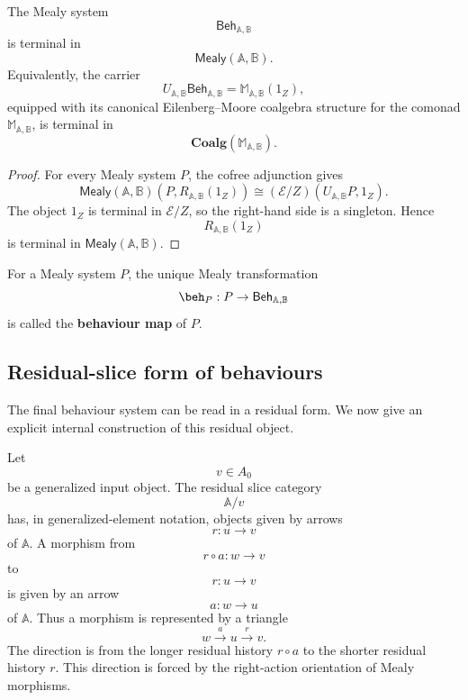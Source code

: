 \begin{theorem}
\label{thm:final-behaviour-coalgebra}
The Mealy system
\[
\mathsf{Beh}_{\mathbb A,\mathbb B}
\]
is terminal in
\[
\mathsf{Mealy}(\mathbb A,\mathbb B).
\]
Equivalently, the carrier
\[
U_{\mathbb A,\mathbb B}\mathsf{Beh}_{\mathbb A,\mathbb B}
=
\mathbb M_{\mathbb A,\mathbb B}(1_Z),
\]
equipped with its canonical Eilenberg--Moore coalgebra structure for the
comonad \(\mathbb M_{\mathbb A,\mathbb B}\), is terminal in
\[
\mathbf{Coalg}(\mathbb M_{\mathbb A,\mathbb B}).
\]
\end{theorem}

\begin{proof}
For every Mealy system \(P\), the cofree adjunction gives
\[
\mathsf{Mealy}(\mathbb A,\mathbb B)
(P,R_{\mathbb A,\mathbb B}(1_Z))
\cong
(\mathcal E/Z)(U_{\mathbb A,\mathbb B}P,1_Z).
\]
The object \(1_Z\) is terminal in \(\mathcal E/Z\), so the right-hand side is
a singleton. Hence
\[
R_{\mathbb A,\mathbb B}(1_Z)
\]
is terminal in \(\mathsf{Mealy}(\mathbb A,\mathbb B)\).
\end{proof}

\begin{definition}
\label{def:behaviour-map}
For a Mealy system \(P\), the unique Mealy transformation
\[
\beh_P:
P\to\mathsf{Beh}_{\mathbb A,\mathbb B}
\]
is called the \textbf{behaviour map} of \(P\).
\end{definition}

\subsection{Residual-slice form of behaviours}
\label{subsec:residual-slice-form-behaviours}

The final behaviour system can be read in a residual form. We now give an
explicit internal construction of this residual object.

Let
\[
v\in A_0
\]
be a generalized input object. The residual slice category
\[
\mathbb A/v
\]
has, in generalized-element notation, objects given by arrows
\[
r:u\to v
\]
of \(\mathbb A\). A morphism from
\[
r\circ a:w\to v
\]
to
\[
r:u\to v
\]
is given by an arrow
\[
a:w\to u
\]
of \(\mathbb A\). Thus a morphism is represented by a triangle
\[
w\xrightarrow{a}u\xrightarrow{r}v.
\]
The direction is from the longer residual history \(r\circ a\) to the shorter
residual history \(r\). This direction is forced by the right-action
orientation of Mealy morphisms.

